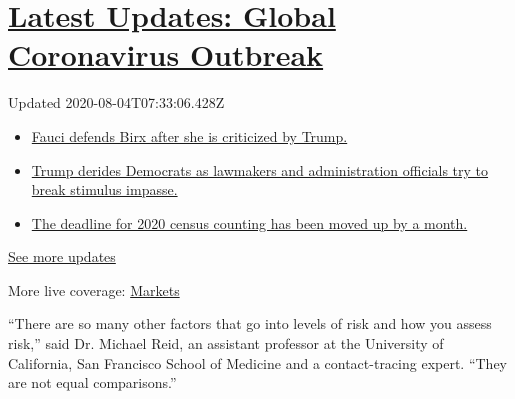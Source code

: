 \hypertarget{latest-updates-global-coronavirus-outbreak}{%
\section{\texorpdfstring{\href{https://www.nytimes3xbfgragh.onion/2020/08/03/world/coronavirus-covid-19.html?action=click\&pgtype=Article\&state=default\&region=MAIN_CONTENT_1\&context=storylines_live_updates}{Latest
Updates: Global Coronavirus
Outbreak}}{Latest Updates: Global Coronavirus Outbreak}}\label{latest-updates-global-coronavirus-outbreak}}

Updated 2020-08-04T07:33:06.428Z

\begin{itemize}
\tightlist
\item
  \href{https://www.nytimes3xbfgragh.onion/2020/08/03/world/coronavirus-covid-19.html?action=click\&pgtype=Article\&state=default\&region=MAIN_CONTENT_1\&context=storylines_live_updates\#link-4547638f}{Fauci
  defends Birx after she is criticized by Trump.}
\item
  \href{https://www.nytimes3xbfgragh.onion/2020/08/03/world/coronavirus-covid-19.html?action=click\&pgtype=Article\&state=default\&region=MAIN_CONTENT_1\&context=storylines_live_updates\#link-15e7f995}{Trump
  derides Democrats as lawmakers and administration officials try to
  break stimulus impasse.}
\item
  \href{https://www.nytimes3xbfgragh.onion/2020/08/03/world/coronavirus-covid-19.html?action=click\&pgtype=Article\&state=default\&region=MAIN_CONTENT_1\&context=storylines_live_updates\#link-e5a2cda}{The
  deadline for 2020 census counting has been moved up by a month.}
\end{itemize}

\href{https://www.nytimes3xbfgragh.onion/2020/08/03/world/coronavirus-covid-19.html?action=click\&pgtype=Article\&state=default\&region=MAIN_CONTENT_1\&context=storylines_live_updates}{See
more updates}

More live coverage:
\href{https://www.nytimes3xbfgragh.onion/live/2020/08/03/business/stock-market-today-coronavirus?action=click\&pgtype=Article\&state=default\&region=MAIN_CONTENT_1\&context=storylines_live_updates}{Markets}

``There are so many other factors that go into levels of risk and how
you assess risk,'' said Dr. Michael Reid, an assistant professor at the
University of California, San Francisco School of Medicine and a
contact-tracing expert. ``They are not equal comparisons.''

